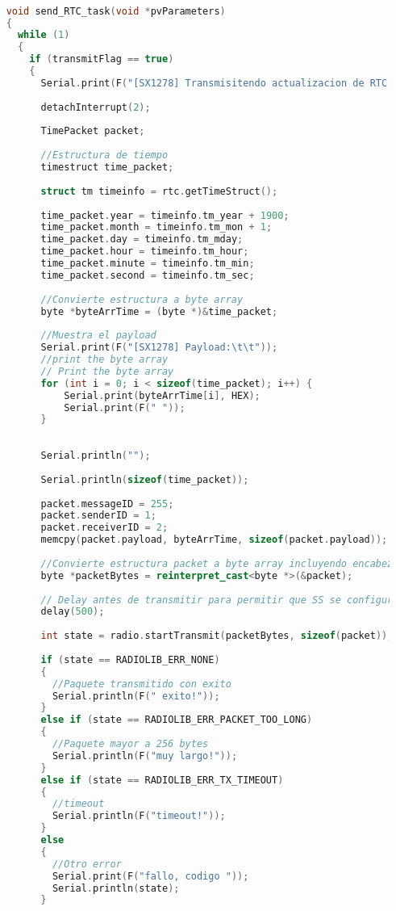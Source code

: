     
\begin{lstlisting}[language=C++, caption=Tarea para envío de actualización de RTC desde estación base]

    void send_RTC_task(void *pvParameters)
    {
      while (1)
      {
        if (transmitFlag == true)
        {
          Serial.print(F("[SX1278] Transmisitendo actualizacion de RTC... "));
    
          detachInterrupt(2);
    
          TimePacket packet;
    
          //Estructura de tiempo
          timestruct time_packet;
    
          struct tm timeinfo = rtc.getTimeStruct();
    
          time_packet.year = timeinfo.tm_year + 1900;
          time_packet.month = timeinfo.tm_mon + 1;
          time_packet.day = timeinfo.tm_mday;
          time_packet.hour = timeinfo.tm_hour;
          time_packet.minute = timeinfo.tm_min;
          time_packet.second = timeinfo.tm_sec;
    
          //Convierte estructura a byte array
          byte *byteArrTime = (byte *)&time_packet;
    
          //Muestra el payload
          Serial.print(F("[SX1278] Payload:\t\t"));
          //print the byte array
          // Print the byte array
          for (int i = 0; i < sizeof(time_packet); i++) {
              Serial.print(byteArrTime[i], HEX);
              Serial.print(F(" "));
          }
    
    
          Serial.println("");
    
          Serial.println(sizeof(time_packet));
    
          packet.messageID = 255;
          packet.senderID = 1;                                        
          packet.receiverID = 2;                                      
          memcpy(packet.payload, byteArrTime, sizeof(packet.payload));
    
          //Convierte estructura packet a byte array incluyendo encabezado
          byte *packetBytes = reinterpret_cast<byte *>(&packet);
    
          // Delay antes de transmitir para permitir que SS se configure en modo listening
          delay(500);
    
          int state = radio.startTransmit(packetBytes, sizeof(packet));
    
          if (state == RADIOLIB_ERR_NONE)
          {
            //Paquete transmitido con exito
            Serial.println(F(" exito!"));
          }
          else if (state == RADIOLIB_ERR_PACKET_TOO_LONG)
          {
            //Paquete mayor a 256 bytes
            Serial.println(F("muy largo!"));
          }
          else if (state == RADIOLIB_ERR_TX_TIMEOUT)
          {
            //timeout
            Serial.println(F("timeout!"));
          }
          else
          {
            //Otro error
            Serial.print(F("fallo, codigo "));
            Serial.println(state);
          }
    

\end{lstlisting}
